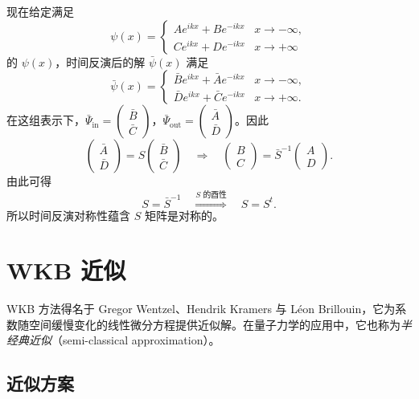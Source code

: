 现在给定满足
\[
  \psi(x)=
  \begin{cases}
    Ae^{ikx}+Be^{-ikx} & x\to-\infty,\\
    Ce^{ikx}+De^{-ikx} & x\to+\infty
  \end{cases}
\]
的 \(\psi(x)\)，时间反演后的解 \(\bar\psi(x)\) 满足
\[
  \bar\psi(x)=
  \begin{cases}
    \bar B e^{ikx}+\bar A e^{-ikx} & x\to-\infty,\\
    \bar D e^{ikx}+\bar C e^{-ikx} & x\to+\infty.
  \end{cases}
\]
在这组表示下，\(\bar\Psi_{\mathrm{in}}=\begin{pmatrix}\bar B\\ \bar C\end{pmatrix}\)，\(\bar\Psi_{\mathrm{out}}=\begin{pmatrix}\bar A\\ \bar D\end{pmatrix}\)。因此
\[
  \begin{pmatrix}\bar A\\ \bar D\end{pmatrix}
  =S\begin{pmatrix}\bar B\\ \bar C\end{pmatrix}
  \quad\Longrightarrow\quad
  \begin{pmatrix}B\\ C\end{pmatrix}
  =\bar S^{-1}\begin{pmatrix}A\\ D\end{pmatrix}.
\]
由此可得
\[
  S=\bar S^{-1}
  \quad\stackrel{\text{\(S\) 的酉性}}{\Longrightarrow}\quad
  S=S^t.
\]
所以时间反演对称性蕴含 \(S\) 矩阵是对称的。


\section{WKB 近似}

WKB 方法得名于 Gregor Wentzel、Hendrik Kramers 与 Léon Brillouin，它为系数随空间缓慢变化的线性微分方程提供近似解。在量子力学的应用中，它也称为\emph{半经典近似}（semi-classical approximation）。

\subsection{近似方案}

